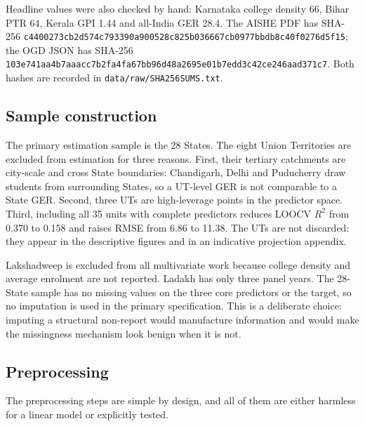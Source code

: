 Headline values were also checked by hand: Karnataka college density 66, Bihar PTR 64, Kerala GPI 1.44 and all-India GER 28.4. The AISHE PDF has SHA-256 \nolinkurl{c4400273cb2d574c793390a900528c825b036667cb0977bbdb8c40f0276d5f15}; the OGD JSON has SHA-256 \nolinkurl{103e741aa4b7aaacc7b2fa4fa67bb96d48a2695e01b7edd3c42ce246aad371c7}. Both hashes are recorded in \texttt{data/raw/SHA256SUMS.txt}.

\subsection{Sample construction}

The primary estimation sample is the 28 States. The eight Union Territories are excluded from estimation for three reasons. First, their tertiary catchments are city-scale and cross State boundaries: Chandigarh, Delhi and Puducherry draw students from surrounding States, so a UT-level GER is not comparable to a State GER. Second, three UTs are high-leverage points in the predictor space. Third, including all 35 units with complete predictors reduces LOOCV $R^2$ from 0.370 to 0.158 and raises RMSE from 6.86 to 11.38. The UTs are not discarded: they appear in the descriptive figures and in an indicative projection appendix.

Lakshadweep is excluded from all multivariate work because college density and average enrolment are not reported. Ladakh has only three panel years. The 28-State sample has no missing values on the three core predictors or the target, so no imputation is used in the primary specification. This is a deliberate choice: imputing a structural non-report would manufacture information and would make the missingness mechanism look benign when it is not.

\subsection{Preprocessing}

The preprocessing steps are simple by design, and all of them are either harmless for a linear model or explicitly tested.

